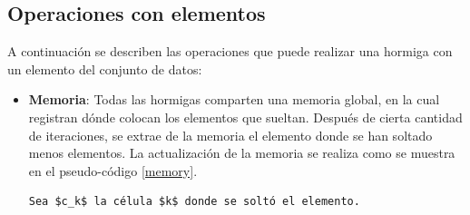 \subsection{Operaciones con elementos}

    A continuación se describen las operaciones que puede realizar una hormiga
con un elemento del conjunto de datos:
\begin{itemize}
    \item \textbf{Memoria}: Todas las hormigas comparten una memoria global, en
la cual registran dónde colocan los elementos que sueltan. Después de cierta
cantidad de iteraciones, se extrae de la memoria el elemento donde se han soltado
menos elementos. La ac\-tua\-li\-za\-ción de la memoria se realiza como se
muestra en el pseudo-código \ref{memory}.
\begin{lstlisting}[float=h!, caption={Actualización de la Memoria}, label=memory]
Sea $c_k$ la célula $k$ donde se soltó el elemento.


\end{lstlisting}
\end{itemize}
